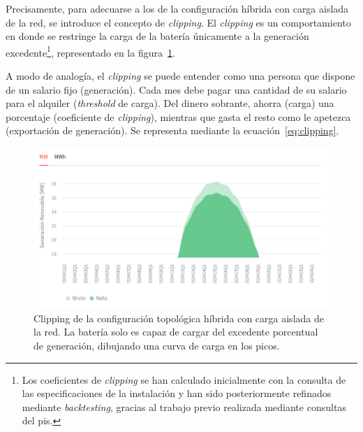 Precisamente, para adecuarse a los de la configuración híbrida con carga aislada de la red, se introduce el concepto de \textit{clipping}. El \textit{clipping} es un comportamiento en donde se restringe la carga de la batería únicamente a la generación excedente\footnote{Los coeficientes de \textit{clipping} se han calculado inicialmente con la consulta de las especificaciones de la instalación y han sido posteriormente refinados mediante \textit{backtesting}, gracias al trabajo previo realizada mediante consultas del \gls{pis}.}, representado en la figura~\ref{fig:clipping}.

A modo de analogía, el \textit{clipping} se puede entender como una persona que dispone de un salario fijo (generación). Cada mes debe pagar una cantidad de su salario para el alquiler (\textit{threshold} de carga). Del dinero sobrante, ahorra (carga) una porcentaje (coeficiente de \textit{clipping}), mientras que gasta el resto como le apetezca (exportación de generación). Se representa mediante la ecuación~\ref{eq:clipping}.

\begin{figure}
  \centering
  \includegraphics[width=0.75\linewidth]{figures/clipping.png}
  \caption[Clipping de configuración topológica híbrida.]{Clipping de la configuración topológica híbrida con carga aislada de la red. La batería solo es capaz de cargar del excedente porcentual de generación, dibujando una curva de carga en los picos.}%
  \label{fig:clipping}
\end{figure}

